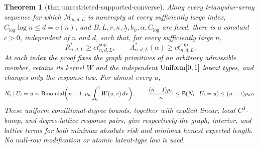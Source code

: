 \documentclass{article}
\newtheorem{theorem}{Theorem}
\begin{document}
\begin{theorem}[thm:unrestricted-supported-converse]\label{thm:unrestricted-supported-converse}
Along every triangular-array sequence for which \(\mathcal M_{n,d,L}\) is nonempty at every sufficiently large index, \(C_{\log}\log n\leq d=o(n)\), and \(B,L,r,\kappa,\underline\lambda,b_\psi,\alpha,C_{\log}\) are fixed, there is a constant \(c>0\), independent of \(n\) and \(d\), such that, for every sufficiently large \(n\),
\[
 R^*_{n,d,L}\geq c\mathfrak r^{\mathrm{sup}}_{n,d,L},
 \qquad
 \Lambda^*_{n,d,L}(\alpha)\geq c\mathfrak r^{\mathrm{sup}}_{n,d,L}.
\]
At each index the proof fixes the graph primitives of an arbitrary admissible member, retains its kernel \(W\) and the independent \({\rm Uniform}[0,1]\) latent types, and changes only the response law.  For almost every \(u\),
\[
 N_i\mid U_i=u
 \sim{\rm Binomial}\!\left(n-1,\rho_n\int_0^1W(u,v)\,dv\right),
 \qquad
 \frac{(n-1)\rho_n}{\kappa}
 \leq\mathbb E(N_i\mid U_i=u)
 \leq(n-1)\rho_n\kappa.
\]
These uniform conditional-degree bounds, together with explicit linear, local \(C^3\)-bump, and degree-lattice response pairs, give respectively the graph, interior, and lattice terms for both minimax absolute risk and minimax honest expected length.  No null-row modification or atomic latent-type law is used.
\end{theorem}
\end{document}
